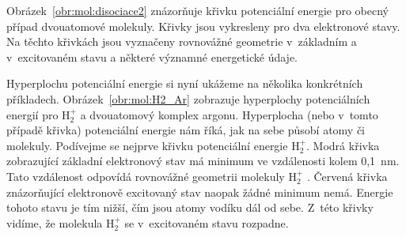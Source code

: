 Obrázek~\ref{obr:mol:disociace2} znázorňuje křivku potenciální energie pro obecný případ dvouatomové molekuly. Křivky jsou vykresleny pro dva elektronové stavy. Na těchto křivkách jsou vyznačeny rovnovážné geometrie v~základním a v~excitovaném stavu a některé významné energetické údaje.


Hyperplochu potenciální energie si nyní ukážeme na několika konkrétních příkladech. Obrázek~\ref{obr:mol:H2_Ar} zobrazuje hyperplochy potenciálních energií pro $\mathrm{H}_2^+$ a dvouatomový komplex argonu. Hyperplocha (nebo v~tomto případě křivka) potenciální energie nám říká, jak na sebe působí atomy či molekuly. Podívejme se nejprve křivku potenciální energie $\mathrm{H}_2^+$. Modrá křivka zobrazující základní elektronový stav má minimum ve vzdálenosti kolem 0,1~nm. Tato vzdálenost odpovídá rovnovážné geometrii molekuly $\mathrm{H}_2^+$ . Červená křivka znázorňující elektronově excitovaný stav naopak žádné minimum nemá. Energie tohoto stavu je tím nižší, čím jsou atomy vodíku dál od sebe. Z~této křivky vidíme, že molekula $\mathrm{H}_2^+$ se v~excitovaném stavu rozpadne.

